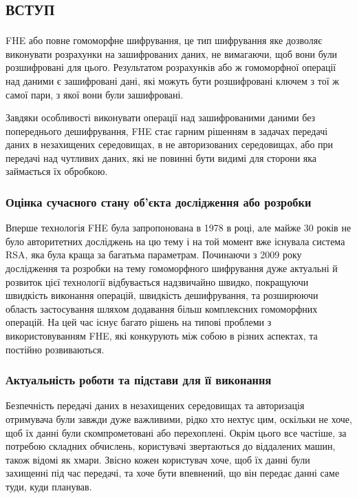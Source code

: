 \newpage
{}
\chapter*{\textsc{вступ}}


FHE або повне гомоморфне шифрування, це тип шифрування яке дозволяє виконувати розрахунки
на зашифрованих даних, не вимагаючи, щоб вони були розшифровані для цього. Результатом
розрахунків або ж гомоморфної операції над даними є зашифровані дані, які можуть бути
розшифровані ключем з тої ж самої пари, з якої вони були зашифровані.

Завдяки особливості виконувати операції над зашифрованими даними без попереднього
дешифрування, FHE стає гарним рішенням в задачах передачі даних в незахищених
середовищах, в не авторизованих середовищах, або при передачі над чутливих даних, які
не повинні бути видимі для сторони яка займається їх обробкою.

\subsection*{Оцінка сучасного стану об’єкта дослідження або розробки}
Вперше технологія FHE була запропонована в 1978 в році, але майже 30 років не було
авторитетних досліджень на цю тему і на той момент вже існувала система RSA, яка була
краща за багатьма параметрам. Починаючи з 2009 року дослідження та розробки на
тему гомоморфного шифрування дуже актуальні й розвиток цієї технології відбувається
надзвичайно швидко, покращуючи швидкість виконання операцій, швидкість дешифрування, та
розширюючи область застосування шляхом додавання більш комплексних гомоморфних операцій.
На цей час існує багато рішень на типові проблеми з використовуванням FHE, які
конкурують між собою в різних аспектах, та постійно розвиваються.

\subsection*{Актуальність роботи та підстави для її виконання}
Безпечність передачі даних в незахищених середовищах та авторизація отримувача були 
завжди дуже важливими, рідко хто нехтує цим, оскільки не хоче, щоб їх данні були
скомпрометовані або перехоплені. Окрім цього все частіше, за потребою складних
обчислень, користувачі звертаються до віддалених машин, також відомі як хмари. Звісно
кожен користувач хоче, щоб їх данні були захищенні під час передачі, та хоче бути
впевнений, що він передає данні саме туди, куди планував.

